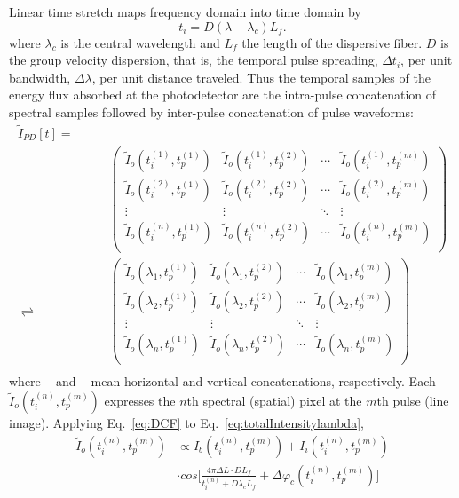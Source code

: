 \documentclass[aps,pra,reprint,superscriptaddress]{revtex4-1}
\DeclareMathOperator{\vercat}{cat_\downarrow} %
\DeclareMathOperator{\horcat}{cat_\rightarrow} %
\begin{document}
Linear time stretch maps frequency domain into time domain by
\begin{equation} \label{eq:DCF}
t_i = D (\lambda - \lambda_c) L_f.
\end{equation}
where $\lambda_c$ is the central wavelength and $L_f$ the length of the dispersive fiber. $D$ is the group velocity dispersion, that is, the temporal pulse spreading, $\Delta t_i$, per unit bandwidth, $\Delta\lambda$, per unit distance traveled. Thus the temporal samples of the energy flux absorbed at the photodetector are the intra-pulse concatenation of spectral samples followed by inter-pulse concatenation of pulse waveforms:
\begin{equation}
\begin{split}
\tilde{I}_{PD}[t] = \quad\quad&\quad\\
\horcat\vercat &
\begin{pmatrix}
\tilde{I}_{o}(t_i^{(1)}, t_p^{(1)})&	\tilde{I}_{o}(t_i^{(1)}, t_p^{(2)})&	\cdots& \tilde{I}_{o}(t_i^{(1)}, t_p^{(m)})\\
\tilde{I}_{o}(t_i^{(2)}, t_p^{(1)})&	\tilde{I}_{o}(t_i^{(2)}, t_p^{(2)})&	\cdots& \tilde{I}_{o}(t_i^{(2)}, t_p^{(m)})\\
\vdots&									\vdots&									\ddots& \vdots								 \\
\tilde{I}_{o}(t_i^{(n)}, t_p^{(1)})&	\tilde{I}_{o}(t_i^{(n)}, t_p^{(2)})&	\cdots& \tilde{I}_{o}(t_i^{(n)}, t_p^{(m)})\\
\end{pmatrix} \\
\rightleftharpoons \horcat\vercat &
\begin{pmatrix}
\tilde{I}_{o}(\lambda_1, t_p^{(1)})  &\tilde{I}_{o}(\lambda_1, t_p^{(2)})   &\cdots  &\tilde{I}_{o}(\lambda_1, t_p^{(m)})\\
\tilde{I}_{o}(\lambda_2, t_p^{(1)})  &\tilde{I}_{o}(\lambda_2, t_p^{(2)})   &\cdots  &\tilde{I}_{o}(\lambda_2, t_p^{(m)})\\
\vdots						   		 &\vdots							    	&\ddots  &\vdots					 \\
\tilde{I}_{o}(\lambda_n, t_p^{(1)})  &\tilde{I}_{o}(\lambda_n, t_p^{(2)})   &\cdots  &\tilde{I}_{o}(\lambda_n, t_p^{(m)})\\
\end{pmatrix} \\
\end{split}
\end{equation}
where $\horcat$ and $\vercat$ mean horizontal and vertical concatenations, respectively. Each $\tilde{I}_{o}(t_i^{(n)}, t_p^{(m)})$ expresses the $n$th spectral (spatial) pixel at the $m$th pulse (line image). Applying Eq.~\ref{eq:DCF} to Eq.~\ref{eq:totalIntensitylambda},
\begin{equation}\label{eq:afterDCF}
\begin{split}
\tilde{I}_{o}(t_i^{(n)}, t_p^{(m)}) & \propto I_b (t_i^{(n)}, t_p^{(m)}) + I_i (t_i^{(n)}, t_p^{(m)}) \\
& \cdot cos\Bigg[ \frac{4\pi\Delta L \cdot D L_f}{t_i^{(n)} + D\lambda_c L_f} + \Delta \varphi_c(t_i^{(n)}, t_p^{(m)}) \Bigg]
\end{split}
\end{equation}
\end{document}
